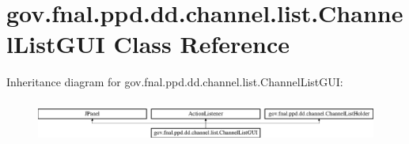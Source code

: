 \hypertarget{classgov_1_1fnal_1_1ppd_1_1dd_1_1channel_1_1list_1_1ChannelListGUI}{\section{gov.\-fnal.\-ppd.\-dd.\-channel.\-list.\-Channel\-List\-G\-U\-I Class Reference}
\label{classgov_1_1fnal_1_1ppd_1_1dd_1_1channel_1_1list_1_1ChannelListGUI}
}
Inheritance diagram for gov.\-fnal.\-ppd.\-dd.\-channel.\-list.\-Channel\-List\-G\-U\-I\-:\begin{figure}[H]
\begin{center}
\leavevmode
\includegraphics[height=1.398252cm]{classgov_1_1fnal_1_1ppd_1_1dd_1_1channel_1_1list_1_1ChannelListGUI}
\end{center}
\end{figure}
